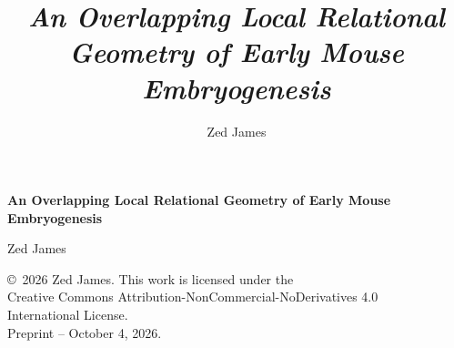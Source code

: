 \documentclass[11pt]{article}
\title{\textit{An Overlapping Local Relational Geometry of Early Mouse Embryogenesis}}
\author{Zed James}
\date{}
\begin{document}
\hypersetup{pageanchor=false}
\begin{titlepage}
  \centering
  \vspace*{0.17\textheight}
  {\LARGE\bfseries An Overlapping Local Relational Geometry of Early Mouse Embryogenesis\par}
  \vfill
  {\large Zed James\par}
  \vspace{1.5em}
  {\small \copyright\ 2026 Zed James. This work is licensed under the\\
  Creative Commons Attribution-NonCommercial-NoDerivatives 4.0\\
  International License.\\[0.8em]
  Preprint -- October 4, 2026.\par}
  \vspace*{0.12\textheight}
\end{titlepage}
\clearpage
\hypersetup{pageanchor=true}
\end{document}
